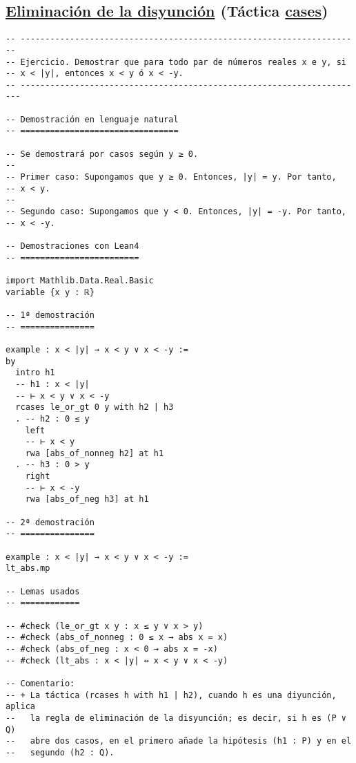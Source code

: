 \subsection{\href{./src/Logica/Eliminacion\_de\_la\_disyuncion.lean}{Eliminación de la disyunción} (Táctica \href{https://bit.ly/3dowIEO}{cases})}
\label{sec:orgfa60910}
\begin{verbatim}
-- ---------------------------------------------------------------------
-- Ejercicio. Demostrar que para todo par de números reales x e y, si
-- x < |y|, entonces x < y ó x < -y.
-- ----------------------------------------------------------------------

-- Demostración en lenguaje natural
-- ================================

-- Se demostrará por casos según y ≥ 0.
--
-- Primer caso: Supongamos que y ≥ 0. Entonces, |y| = y. Por tanto,
-- x < y.
--
-- Segundo caso: Supongamos que y < 0. Entonces, |y| = -y. Por tanto,
-- x < -y.

-- Demostraciones con Lean4
-- ========================

import Mathlib.Data.Real.Basic
variable {x y : ℝ}

-- 1ª demostración
-- ===============

example : x < |y| → x < y ∨ x < -y :=
by
  intro h1
  -- h1 : x < |y|
  -- ⊢ x < y ∨ x < -y
  rcases le_or_gt 0 y with h2 | h3
  . -- h2 : 0 ≤ y
    left
    -- ⊢ x < y
    rwa [abs_of_nonneg h2] at h1
  . -- h3 : 0 > y
    right
    -- ⊢ x < -y
    rwa [abs_of_neg h3] at h1

-- 2ª demostración
-- ===============

example : x < |y| → x < y ∨ x < -y :=
lt_abs.mp

-- Lemas usados
-- ============

-- #check (le_or_gt x y : x ≤ y ∨ x > y)
-- #check (abs_of_nonneg : 0 ≤ x → abs x = x)
-- #check (abs_of_neg : x < 0 → abs x = -x)
-- #check (lt_abs : x < |y| ↔ x < y ∨ x < -y)

-- Comentario:
-- + La táctica (rcases h with h1 | h2), cuando h es una diyunción, aplica
--   la regla de eliminación de la disyunción; es decir, si h es (P ∨ Q)
--   abre dos casos, en el primero añade la hipótesis (h1 : P) y en el
--   segundo (h2 : Q).
\end{verbatim}

